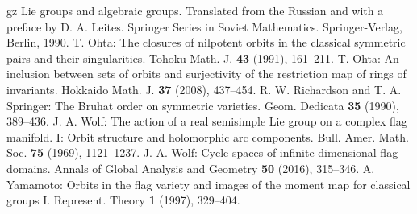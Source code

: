 \documentclass{amsart}
\theoremstyle{definition}
\begin{document}
\begin{thebibliography}{gz}
Lie groups and algebraic groups.
Translated from the Russian and with a preface by D. A. Leites. Springer Series in Soviet Mathematics. Springer-Verlag, Berlin, 1990.
 T. Ohta: The closures of nilpotent orbits in the classical symmetric pairs and their singularities. Tohoku Math. J. \textbf{43} (1991), 161--211.
 T. Ohta: An inclusion between sets of orbits and surjectivity of the restriction map of rings of invariants.
Hokkaido Math. J. \textbf{37} (2008), 437--454.
 R. W. Richardson and T. A. Springer:
The Bruhat order on symmetric varieties. Geom. Dedicata \textbf{35} (1990), 389--436.
 J. A. Wolf: The action of a real semisimple Lie group on a complex flag manifold. I: Orbit structure and holomorphic arc components.  Bull. Amer. Math. Soc. \textbf{75} (1969), 1121--1237.
 J. A. Wolf: Cycle spaces of infinite dimensional flag domains. Annals of Global Analysis and Geometry \textbf{50} (2016), 315--346.
 A. Yamamoto:
Orbits in the flag variety and images of the moment map for classical groups I.
Represent. Theory \textbf{1} (1997), 329--404.
\end{thebibliography}
\end{document}
